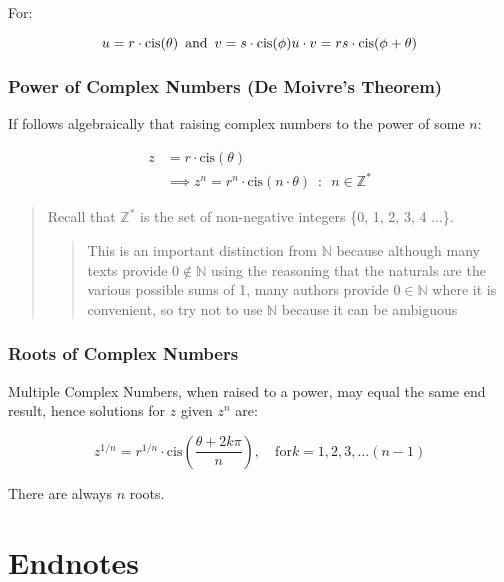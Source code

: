 \documentclass[
]{article}
\begin{document}
For:

\[u = r\cdot \text{cis}(\theta) \enspace \text{and} \enspace v = s \cdot \text{cis}(\phi) \\
\ \\
u\cdot v = rs \cdot \text{cis}(\phi + \theta)\]

\hypertarget{header-n974}{%
\subsubsection{Power of Complex Numbers (De Moivre's
Theorem)}\label{header-n974}}

If follows algebraically that raising complex numbers to the power of
some \(n\):

\begin{align}
z &= r \cdot \text{cis}(\theta) \\
  &\implies z^n = r^n \cdot \text{cis}(n\cdot \theta) \enspace : \enspace n \in \mathbb{Z^*}
\end{align}

\begin{quote}
Recall that \(\mathbb{Z^*}\) is the set of non-negative integers \{0, 1,
2, 3, 4 ...\}.

\begin{quote}
This is an important distinction from \(\mathbb{N}\) because although
many texts provide \(0 \notin \mathbb{N}\) using the reasoning that the
naturals are the various possible sums of 1, many authors provide
\(0 \in \mathbb{N}\) where it is convenient, so try not to use
\(\mathbb{N}\) because it can be ambiguous
\end{quote}
\end{quote}

\hypertarget{header-n983}{%
\subsubsection{Roots of Complex Numbers}\label{header-n983}}

Multiple Complex Numbers, when raised to a power, may equal the same end
result, hence solutions for \(z\) given \(z^n\) are:

\[z^{1/n} = r ^{1/n} \cdot \text{cis}\left( \frac{\theta + 2k\pi}{n} \right ), \quad \text{for} k = 1,2,3, \dots (n-1)\]

There are always \(n\) roots.

\hypertarget{header-n988}{%
\section{Endnotes}\label{header-n988}}
\end{document}

